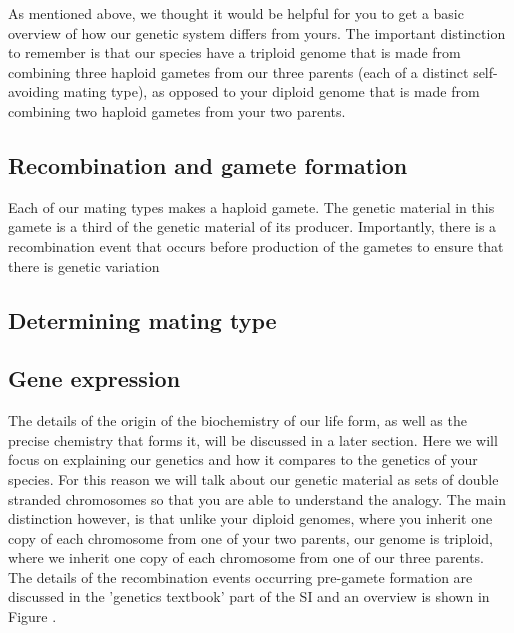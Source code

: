 As mentioned above, we thought it would be helpful for you to get a basic overview of how our genetic system differs from yours. The important distinction to remember is that our species have a triploid genome that is made from combining three haploid gametes from our three parents (each of a distinct self-avoiding mating type), as opposed to your diploid genome that is made from combining two haploid gametes from your two parents.

\subsection{Recombination and gamete formation}

Each of our mating types makes a haploid gamete. The genetic material in this gamete is a third of the genetic material of its producer. Importantly, there is a recombination event that occurs before production of the gametes to ensure that there is genetic variation


\subsection{Determining mating type}

\subsection{Gene expression}



The details of the origin of the biochemistry of our life form, as well as the precise chemistry that forms it, will be discussed in a later section. Here we will focus on explaining our genetics and how it compares to the genetics of your species. For this reason we will talk about our genetic material as sets of double stranded chromosomes so that you are able to understand the analogy. The main distinction however, is that unlike your diploid genomes, where you inherit one copy of each chromosome from one of your two parents, our genome is triploid, where we inherit one copy of each chromosome from one of our three parents. The details of the recombination events occurring pre-gamete formation are discussed in the 'genetics textbook' part of the SI and an overview is shown in Figure .

